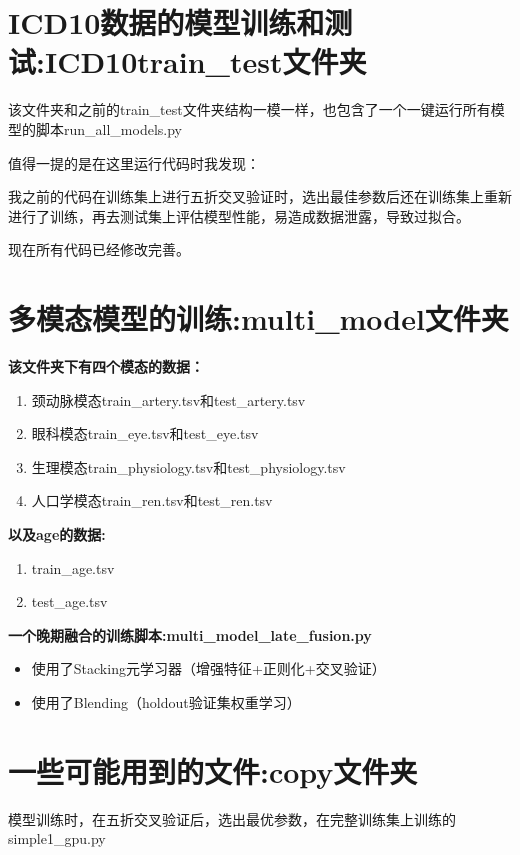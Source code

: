 \documentclass[UTF8]{report}
\theoremstyle{MyLineTheoremStyle} %
\theoremstyle{MyBlockTheoremStyle} %
\theoremstyle{MySubsubsectionStyle} %
\begin{document}
\section{ICD10数据的模型训练和测试:ICD10train\_test文件夹}

该文件夹和之前的train\_test文件夹结构一模一样，也包含了一个一键运行所有模型的脚本run\_all\_models.py

值得一提的是在这里运行代码时我发现：

我之前的代码在训练集上进行五折交叉验证时，选出最佳参数后还在训练集上重新进行了训练，再去测试集上评估模型性能，易造成数据泄露，导致过拟合。

现在所有代码已经修改完善。

\section{多模态模型的训练:multi\_model文件夹}

\textbf{该文件夹下有四个模态的数据：}
\begin{enumerate}
    \item 颈动脉模态train\_artery.tsv和test\_artery.tsv
    \item 眼科模态train\_eye.tsv和test\_eye.tsv
    \item 生理模态train\_physiology.tsv和test\_physiology.tsv
    \item 人口学模态train\_ren.tsv和test\_ren.tsv
\end{enumerate}

\textbf{以及age的数据:}
\begin{enumerate}
    \item train\_age.tsv
    \item test\_age.tsv
\end{enumerate}

\textbf{一个晚期融合的训练脚本:multi\_model\_late\_fusion.py}
\begin{itemize}
    \item 使用了Stacking元学习器（增强特征+正则化+交叉验证）
    \item 使用了Blending（holdout验证集权重学习）
\end{itemize}


\section{一些可能用到的文件:copy文件夹}

模型训练时，在五折交叉验证后，选出最优参数，在完整训练集上训练的simple1\_gpu.py
\end{document}
